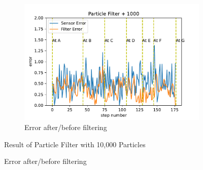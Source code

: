 \documentclass[conference,onecolumn]{IEEEtran}
\begin{document}
\begin{figure}[H]
\begin{subfigure}[t]{.3\linewidth}
    \centering\includegraphics[width=\linewidth]{Figs/Particle Filter + 1000Error.pdf}
    \caption{Error after/before filtering}
  \end{subfigure}

   \smallskip\hrulefill \smallskip
  
  
  Result of Particle Filter with 10,000 Particles
  \medskip


\end{figure}
\end{document}
